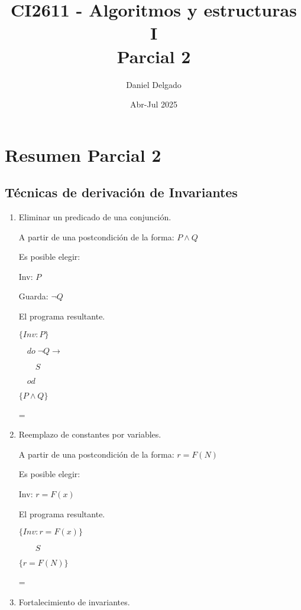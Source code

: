 \documentclass[hidelinks]{article}
\title{CI2611 - Algoritmos y estructuras I \\ Parcial 2}
\date{Abr-Jul 2025}
\author{Daniel Delgado}
\newenvironment{absolutelynopagebreak}
{\par\nobreak\vfil\penalty0\vfilneg
	\vtop\bgroup}
{\par\xdef\tpd{\the\prevdepth}\egroup
	\prevdepth=\tpd}
\begin{document}
\maketitle

\tableofcontents

\newpage

\section{Resumen Parcial 2}

\subsection{Técnicas de derivación de Invariantes}\par

\begin{enumerate}
	\item Eliminar un predicado de una conjunción.\par
	      A partir de una postcondición de la forma: $P \land Q$\par
	      Es posible elegir:\par
	      Inv: $P$\par
	      Guarda: $\neg Q$\par
	      El programa resultante.\par
	      \begin{absolutelynopagebreak}
		      $\{Inv: P\}$\par
		      $\quad do \; \neg Q \rightarrow$\par
		      $\qquad S$\par
		      $\quad od$\par
		      $\{P \land Q\}$\par
	      \end{absolutelynopagebreak}
	\item Reemplazo de constantes por variables.\par
	      A partir de una postcondición de la forma: $r = F(N)$\par
	      Es posible elegir:\par
	      Inv: $r = F(x)$\par
	      El programa resultante.\par
	      \begin{absolutelynopagebreak}
		      $\{Inv: r = F(x)\}$\par
		      $\qquad S$\par
		      $\{r = F(N)\}$\par
	      \end{absolutelynopagebreak}
	\item Fortalecimiento de invariantes.\par
\end{enumerate}
\end{document}
